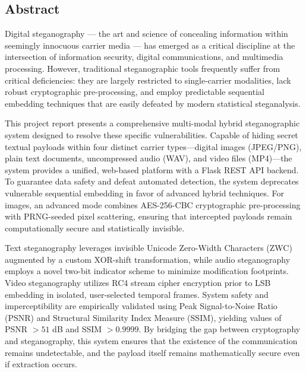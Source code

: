 \documentclass[12pt,a4paper]{report}
\begin{document}
\vfill
\begin{titlepage}
\chapter*{Abstract}
Digital steganography — the art and science of concealing information within seemingly innocuous carrier media — has emerged as a critical discipline at the intersection of information security, digital communications, and multimedia processing. However, traditional steganographic tools frequently suffer from critical deficiencies: they are largely restricted to single-carrier modalities, lack robust cryptographic pre-processing, and employ predictable sequential embedding techniques that are easily defeated by modern statistical steganalysis. 

This project report presents a comprehensive multi-modal hybrid steganographic system designed to resolve these specific vulnerabilities. Capable of hiding secret textual payloads within four distinct carrier types—digital images (JPEG/PNG), plain text documents, uncompressed audio (WAV), and video files (MP4)—the system provides a unified, web-based platform with a Flask REST API backend. To guarantee data safety and defeat automated detection, the system deprecates vulnerable sequential embedding in favor of advanced hybrid techniques. For images, an advanced mode combines AES-256-CBC cryptographic pre-processing with PRNG-seeded pixel scattering, ensuring that intercepted payloads remain computationally secure and statistically invisible. 

Text steganography leverages invisible Unicode Zero-Width Characters (ZWC) augmented by a custom XOR-shift transformation, while audio steganography employs a novel two-bit indicator scheme to minimize modification footprints. Video steganography utilizes RC4 stream cipher encryption prior to LSB embedding in isolated, user-selected temporal frames. System safety and imperceptibility are empirically validated using Peak Signal-to-Noise Ratio (PSNR) and Structural Similarity Index Measure (SSIM), yielding values of PSNR $> 51$ dB and SSIM $> 0.9999$. By bridging the gap between cryptography and steganography, this system ensures that the existence of the communication remains undetectable, and the payload itself remains mathematically secure even if extraction occurs.

\end{titlepage}
\tableofcontents
\cleardoublepage
\end{document}
